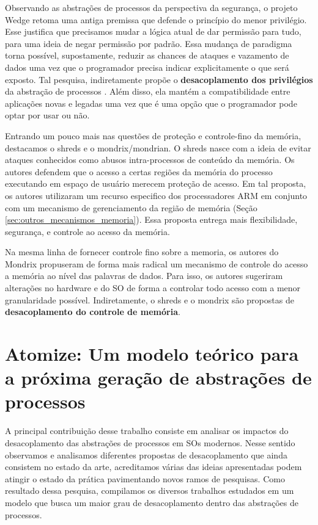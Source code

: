 Observando as abstrações de processos da perspectiva da segurança, o projeto
Wedge retoma uma antiga premissa que defende o princípio do menor privilégio.
Esse justifica que precisamos mudar a lógica atual de dar permissão para tudo,
para uma ideia de negar permissão por padrão. Essa mudança de paradigma torna
possível, supostamente, reduzir as chances de ataques e vazamento de dados uma
vez que o programador precisa indicar explicitamente o que será exposto. Tal
pesquisa, indiretamente propõe o \textbf{desacoplamento dos privilégios} da
abstração de processos . Além disso, ela mantém a compatibilidade entre
aplicações novas e legadas uma vez que é uma opção que o programador pode optar
por usar ou não.

Entrando um pouco mais nas questões de proteção e controle-fino da memória,
destacamos o shreds e o mondrix/mondrian. O shreds nasce com a ideia de evitar
ataques conhecidos como abusos intra-processos de conteúdo da memória.  Os
autores defendem que o acesso a certas regiões da memória do processo
executando em espaço de usuário merecem proteção de acesso. Em tal proposta, os
autores utilizaram um recurso especifico dos processadores ARM em conjunto com
um mecanismo de gerenciamento da região de memória (Seção
\ref{sec:outros_mecanismos_memoria}). Essa proposta entrega mais flexibilidade,
segurança, e controle ao acesso da memória.

Na mesma linha de fornecer controle fino sobre a memoria, os autores do Mondrix
propuseram de forma mais radical um mecanismo de controle do acesso a memória
ao nível das palavras de dados. Para isso, os autores sugeriram alterações no
hardware e do SO de forma a controlar todo acesso com a menor granularidade
possível. Indiretamente, o shreds e o mondrix são propostas de
\textbf{desacoplamento do controle de memória}.

\section{Atomize: Um modelo teórico para a próxima geração de abstrações de processos}

A principal contribuição desse trabalho consiste em analisar os impactos do
desacoplamento das abstrações de processos em SOs modernos. Nesse sentido
observamos e analisamos diferentes propostas de desacoplamento que ainda
consistem no estado da arte, acreditamos várias das ideias apresentadas podem
atingir o estado da prática pavimentando novos ramos de pesquisas. Como
resultado dessa pesquisa, compilamos os diversos trabalhos estudados em um
modelo que busca um maior grau de desacoplamento dentro das abstrações de
processos.


